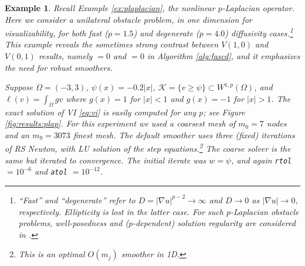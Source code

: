 \documentclass[letterpaper,final,12pt,reqno]{amsart}
\theoremstyle{cstyle}
\theoremstyle{cstyle*}
\theoremstyle{dstyle}
\newtheorem{example}[theorem]{Example}
\numberwithin{equation}{section}
\numberwithin{figure}{section}
\numberwithin{table}{section}
\numberwithin{theorem}{section}
\newcommand{\grad}{\nabla}
\begin{document}
\begin{example}  \label{ex:results:plap}
Recall Example \ref{ex:plaplacian}, the nonlinear $p$-Laplacian operator.  Here we consider a unilateral obstacle problem, in one dimension for visualizability, for both fast ($p=1.5$) and degenerate ($p=4.0$) diffusivity cases.\footnote{``Fast'' and ``degenerate'' refer to $D=|\grad u|^{p-2}\to \infty$ and $D\to 0$ as $|\grad u|\to 0$, respectively.  Ellipticity is lost in the latter case.  For such $p$-Laplacian obstacle problems, well-posedness and ($p$-dependent) solution regularity are considered in \cite{ChoeLewis1991}.}  This example reveals the sometimes strong contrast between $V(1,0)$ and $V(0,1)$ results, namely  $=0$ and  $=0$ in Algorithm \ref{alg:fascd}, and it emphasizes the need for robust smoothers.

Suppose $\Omega=(-3,3)$, $\psi(x) = -0.2|x|$, $\mathcal{K} = \{v \ge \psi\} \subset W^{1,p}(\Omega)$, and $\ell(v) = \int_\Omega g v$ where $g(x)=1$ for $|x|<1$ and $g(x)=-1$ for $|x|>1$.  The exact solution of VI \eqref{eq:vi} is easily computed for any $p$; see Figure \ref{fig:results:plap}.  For this experiment we used a coarsest mesh of $m_0=7$ nodes and an $m_9=3073$ finest mesh.  The default smoother uses three (fixed) iterations of RS Newton, with LU solution of the step equations.\footnote{This is an optimal $O(m_j)$ smoother in 1D.}  The coarse solver is the same but iterated to convergence.  The initial iterate was $w=\psi$, and again \texttt{rtol} $= 10^{-6}$ and \texttt{atol} $= 10^{-12}$.


\end{example}
\end{document}
